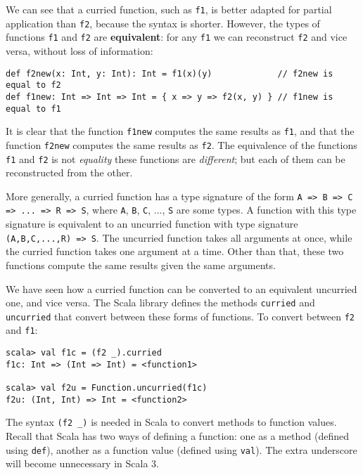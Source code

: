 We can see that a curried function, such as \lstinline!f1!, is better
adapted for partial application than \lstinline!f2!, because the
syntax is shorter. However, the types of functions \lstinline!f1!
and \lstinline!f2! are\textbf{ equivalent}:
for any \lstinline!f1! we can reconstruct \lstinline!f2! and vice
versa, without loss of information:
\begin{lstlisting}
def f2new(x: Int, y: Int): Int = f1(x)(y)             // f2new is equal to f2
def f1new: Int => Int => Int = { x => y => f2(x, y) } // f1new is equal to f1
\end{lstlisting}
It is clear that the function \lstinline!f1new! computes the same
results as \lstinline!f1!, and that the function \lstinline!f2new!
computes the same results as \lstinline!f2!. The equivalence of the
functions \lstinline!f1! and \lstinline!f2! is not \emph{equality}
 \textemdash{} these functions are \emph{different}; but each of them
can be reconstructed from the other. 

More generally, a curried function has a type signature of the form
\lstinline!A => B => C => ... => R => S!, where \lstinline!A!, \lstinline!B!,
\lstinline!C!, ..., \lstinline!S! are some types. A function with
this type signature is equivalent to an uncurried
function with type signature \lstinline!(A,B,C,...,R) => S!. The
uncurried function takes all arguments at once, while the curried
function takes one argument at a time. Other than that, these two
functions compute the same results given the same arguments.

We have seen how a curried function can be converted to an equivalent
uncurried one, and vice versa. The Scala library defines the methods
\lstinline!curried! and \lstinline!uncurried! that convert between
these forms of functions. To convert between \lstinline!f2! and \lstinline!f1!:
\begin{lstlisting}
scala> val f1c = (f2 _).curried
f1c: Int => (Int => Int) = <function1>

scala> val f2u = Function.uncurried(f1c)
f2u: (Int, Int) => Int = <function2> 
\end{lstlisting}
The syntax \lstinline!(f2 _)! is needed in Scala to convert methods
to function values. Recall that Scala has two ways of defining a function:
one as a method (defined using \lstinline!def!),
another as a function value (defined using
\lstinline!val!). The extra underscore will become unnecessary in
Scala 3.

